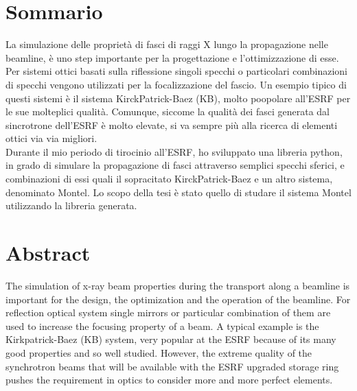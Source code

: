 %
%
\cleardoublepage
%
%
%
\begingroup
\let\cleardoublepage\relax
\let\cleardoublepage\relax
%
\chapter*{Sommario}
%
La simulazione delle proprietà di fasci di raggi X lungo la propagazione nelle beamline, è uno step importante per la progettazione e l'ottimizzazione di esse. Per sistemi ottici basati sulla riflessione singoli specchi o particolari combinazioni di specchi vengono utilizzati per la focalizzazione del fascio. Un esempio tipico di questi sistemi è il sistema KirckPatrick-Baez (KB), molto poopolare all'ESRF per le sue molteplici qualità. Comunque, siccome la qualità dei fasci generata dal sincrotrone dell'ESRF è molto elevate, si va sempre più alla ricerca di elementi ottici via via migliori.
\\
Durante il mio periodo di tirocinio all'ESRF, ho sviluppato una libreria python, in grado di simulare la propagazione di fasci attraverso semplici specchi sferici, e combinazioni di essi quali il sopracitato KirckPatrick-Baez e un altro sistema, denominato Montel. Lo scopo della tesi è stato quello di studare il sistema Montel utilizzando la libreria generata.
\medskip
%
%
\clearpage
%
%
%
%
\chapter*{Abstract}
The simulation of x-ray beam properties during the transport along a beamline is important for the design, the optimization and the operation of the beamline. For reflection optical system single mirrors or particular combination of them are used to increase the focusing property of a beam. A typical example is the Kirkpatrick-Baez (KB) system, very popular at the ESRF because of its many good properties and so well studied. However, the extreme quality of the synchrotron beams that will be available with the ESRF upgraded storage ring pushes the requirement in optics to consider more and more perfect elements.

